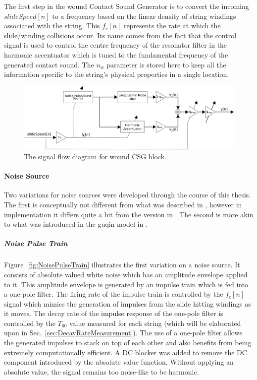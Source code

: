 \documentclass[../main.tex]{subfiles}
\begin{document}
The first step in the wound Contact Sound Generator is to convert the incoming $slideSpeed[n]$ to a frequency based on the linear density of string windings associated with the string. This $f_c[n]$ represents the rate at which the slide/winding collisions occur. Its name comes from the fact that the control signal is used to control the centre frequency of the resonator filter in the harmonic accentuator which is tuned to the fundamental frequency of the generated contact sound. The $n_w$ parameter is stored here to keep all the information specific to the string's physical properties in a single location.

\begin{figure}[h]
    \centering
    \includegraphics[scale=.5]{./images/diagrams/CSG_wound.png}
    \caption{The signal flow diagram for wound CSG block.}
    \label{fig:CSG_wound}
\end{figure}

\paragraph{Noise Source}
Two variations for noise sources were developed through the course of this thesis. The first is conceptually not different from what was described in , however in implementation it differs quite a bit from the version in . The second is more akin to what was introduced in  the guqin model in .

\subparagraph{Noise Pulse Train}
Figure~\ref{fig:NoisePulseTrain} illustrates the first variation on a noise source. It consists of absolute valued white noise which has an amplitude envelope applied to it. This amplitude envelope is generated by an impulse train which is fed into a one-pole filter. The firing rate of the impulse train is controlled by the $f_c[n]$ signal which mimics the generation of impulses from the slide hitting windings as it moves. The decay rate of the impulse response of the one-pole filter is controlled by the $T_{60}$ value measured for each string (which will be elaborated upon in Sec.~\ref{sec:DecayRateMeasurement}). The use of a one-pole filter allows the generated impulses to stack on top of each other and also benefits from being extremely computationally efficient. A DC blocker was added to remove the DC component introduced by the absolute value function. Without applying an absolute value, the signal remains too noise-like to be harmonic.
\end{document}
